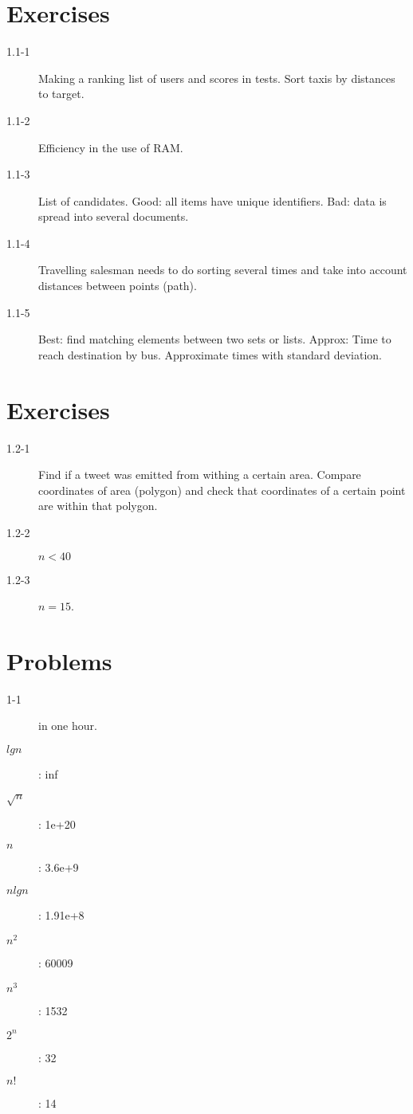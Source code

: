 \section*{Exercises}

\begin{description}
 \item[1.1-1] Making a ranking list of users and scores in tests. Sort taxis by distances to target.
 \item[1.1-2] Efficiency in the use of RAM.
 \item[1.1-3] List of candidates. Good: all items have unique identifiers. Bad: data is spread into several documents.
 \item[1.1-4] Travelling salesman needs to do sorting several times and take into account distances between points (path).
 \item[1.1-5] Best: find matching elements between two sets or lists. Approx: Time to reach destination by bus. Approximate times with standard deviation.
\end{description}


\section*{Exercises}

\begin{description}
 \item[1.2-1] Find if a tweet was emitted from withing a certain area. Compare
     coordinates of area (polygon) and check that coordinates of a certain
     point are within that polygon.
 \item[1.2-2] $n < 40$
 \item[1.2-3] $n = 15$.
\end{description}



\section*{Problems}
\begin{description}
\item[1-1] in one hour.
\item[$lgn$]: inf
\item[$\sqrt{n}$]: 1e+20
\item[$n$]: 3.6e+9
\item[$nlgn$]: 1.91e+8
\item[$n^2$]: 60009
\item[$n^3$]: 1532
\item[$2^n$]: 32
\item[$n!$]: 14
\end{description}

